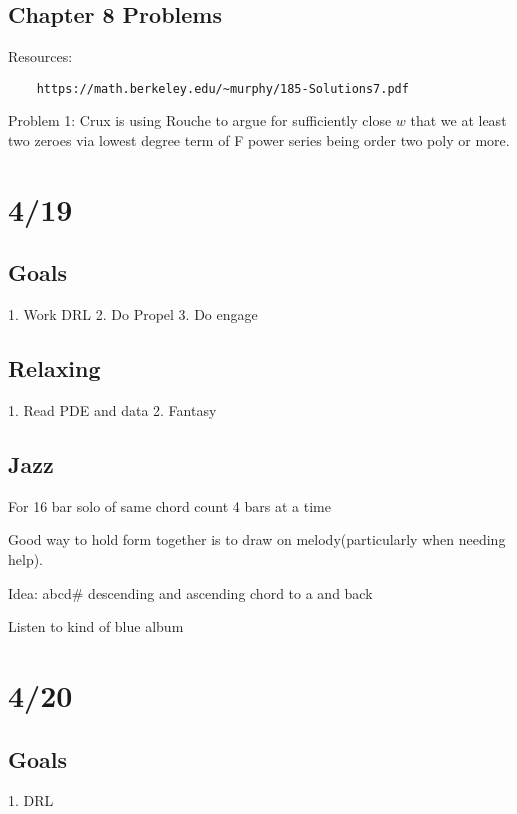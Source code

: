 \documentclass[11pt]{article}
\theoremstyle{remark}
\begin{document}
\subsection{Chapter 8 Problems}

Resources:

\begin{verbatim}
	https://math.berkeley.edu/~murphy/185-Solutions7.pdf
\end{verbatim}

Problem 1: Crux is using Rouche to argue for sufficiently close $w$ that we at least two zeroes via lowest degree term of F power series being order two poly or more.

\section{4/19}

\subsection{Goals}

1. Work DRL
2. Do Propel
3. Do engage

\subsection{Relaxing}

1. Read PDE and data
2. Fantasy

\subsection{Jazz}

For 16 bar solo of same chord count 4 bars at a time

Good way to hold form together is to draw on melody(particularly when needing help).

Idea: abcd# descending and ascending chord to a and back

Listen to kind of blue album

\section{4/20}

\subsection{Goals}

1. DRL
\end{document}
